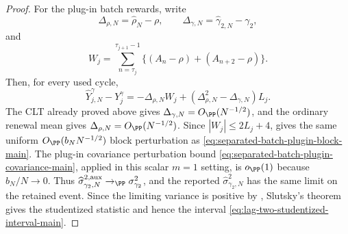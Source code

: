 \begin{proof}
For the plug-in batch rewards, write
\[
\Delta_{\rho,N}=\widehat\rho_N-\rho,\qquad
\Delta_{\gamma,N}=\widehat\gamma_{2,N}-\gamma_2,
\]
and
\[
W_j=\sum_{n=\tau_j}^{\tau_{j+1}-1}
\bigl\{(A_n-\rho)+(A_{n+2}-\rho)\bigr\}.
\]
Then, for every used cycle,
\begin{equation}\label{eq:lag-two-plugin-cycle-difference-main}
\widehat Y^\gamma_{j,N}-Y^\gamma_j
=-\Delta_{\rho,N}W_j
+(\Delta_{\rho,N}^2-\Delta_{\gamma,N})L_j .
\end{equation}
The CLT already proved above gives
\(\Delta_{\gamma,N}=O_{\PP}(N^{-1/2})\), and the ordinary renewal mean gives
\(\Delta_{\rho,N}=O_{\PP}(N^{-1/2})\).  Since \(|W_j|\le2L_j+4\),
 gives the same uniform
\(O_{\PP}(b_NN^{-1/2})\) block perturbation as
\eqref{eq:separated-batch-plugin-block-main}.  The plug-in covariance
perturbation bound \eqref{eq:separated-batch-plugin-covariance-main}, applied
in this scalar \(m=1\) setting, is \(o_{\PP}(1)\) because \(b_N/N\to0\).
Thus
\(\widehat\sigma^{2,\rm aux}_{\gamma_2,N}\to_{\PP}\sigma_{\gamma_2}^2\), and
the reported \(\widehat\sigma^2_{\gamma_2,N}\) has the same limit on the
retained event.
Since the limiting variance is positive by
, Slutsky's theorem gives the
studentized statistic and hence the interval
\eqref{eq:lag-two-studentized-interval-main}.
\end{proof}

